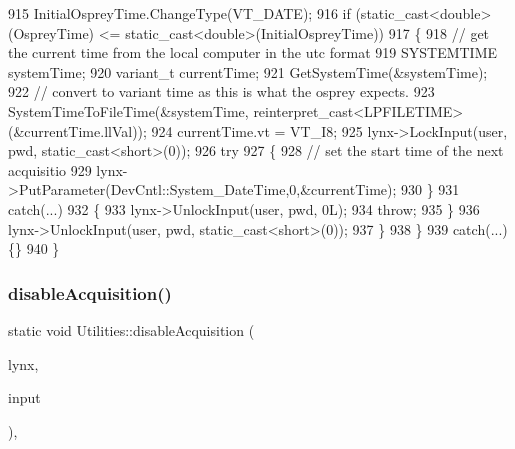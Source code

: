 \begin{DoxyCode}
915             InitialOspreyTime.ChangeType(VT\_DATE);
916             \textcolor{keywordflow}{if} (static\_cast<double>(OspreyTime) <= static\_cast<double>(InitialOspreyTime))
917             \{
918                 \textcolor{comment}{// get the current time from the local computer in the utc format}
919                 SYSTEMTIME systemTime;
920                 variant\_t currentTime;
921                 GetSystemTime(&systemTime);
922                 \textcolor{comment}{// convert to variant time as this is what the osprey expects.}
923                 SystemTimeToFileTime(&systemTime, reinterpret\_cast<LPFILETIME>(&currentTime.llVal));
924                 currentTime.vt = VT\_I8;
925                 lynx->LockInput(user, pwd, static\_cast<short>(0));
926                 \textcolor{keywordflow}{try}
927                 \{
928                     \textcolor{comment}{// set the start time of the next acquisitio}
929                     lynx->PutParameter(DevCntl::System\_DateTime,0,&currentTime);
930                 \}
931                 \textcolor{keywordflow}{catch}(...) 
932                 \{
933                     lynx->UnlockInput(user, pwd, 0L);
934                     \textcolor{keywordflow}{throw};
935                 \}
936                 lynx->UnlockInput(user, pwd, static\_cast<short>(0));
937             \}
938         \}
939         \textcolor{keywordflow}{catch}(...) \{\}
940     \}
\end{DoxyCode}
\mbox{\label{class_utilities_aa881fc2e3136227f05d6afcc562ad98a_aa881fc2e3136227f05d6afcc562ad98a}} 
\subsubsection{\texorpdfstring{disable\+Acquisition()}{disableAcquisition()}\hspace{0.1cm}{\footnotesize\ttfamily [2/2]}}
{\footnotesize\ttfamily static void Utilities\+::disable\+Acquisition (\begin{DoxyParamCaption}\item[{Dev\+Cntl\+::\+I\+Device\+Ex\+Ptr \&}]{lynx,  }\item[{L\+O\+NG}]{input }\end{DoxyParamCaption})\hspace{0.3cm}{\ttfamily [inline]}, {\ttfamily [static]}}

